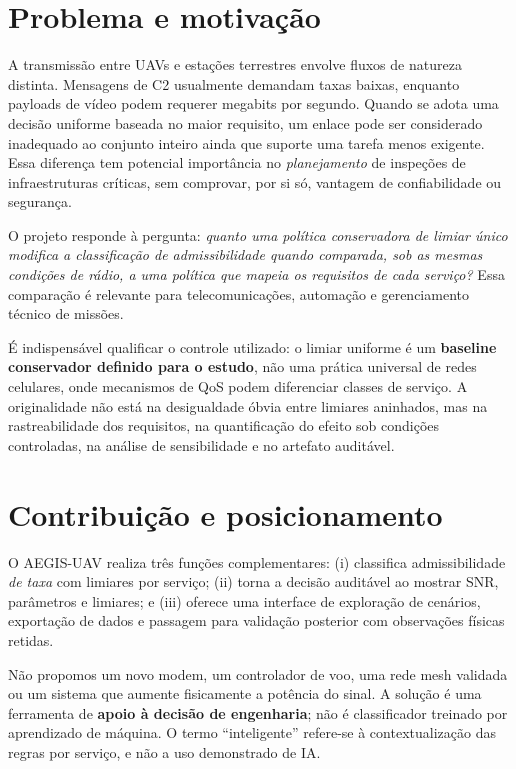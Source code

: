 \documentclass[10pt,a4paper,twocolumn]{article}
\begin{document}
\section{Problema e motivação}
A transmissão entre UAVs e estações terrestres envolve fluxos de natureza distinta. Mensagens de C2 usualmente demandam taxas baixas, enquanto payloads de vídeo podem requerer megabits por segundo. Quando se adota uma decisão uniforme baseada no maior requisito, um enlace pode ser considerado inadequado ao conjunto inteiro ainda que suporte uma tarefa menos exigente. Essa diferença tem potencial importância no \emph{planejamento} de inspeções de infraestruturas críticas, sem comprovar, por si só, vantagem de confiabilidade ou segurança.

O projeto responde à pergunta: \emph{quanto uma política conservadora de limiar único modifica a classificação de admissibilidade quando comparada, sob as mesmas condições de rádio, a uma política que mapeia os requisitos de cada serviço?} Essa comparação é relevante para telecomunicações, automação e gerenciamento técnico de missões.

É indispensável qualificar o controle utilizado: o limiar uniforme é um \textbf{baseline conservador definido para o estudo}, não uma prática universal de redes celulares, onde mecanismos de QoS podem diferenciar classes de serviço. A originalidade não está na desigualdade óbvia entre limiares aninhados, mas na rastreabilidade dos requisitos, na quantificação do efeito sob condições controladas, na análise de sensibilidade e no artefato auditável.

\section{Contribuição e posicionamento}
O AEGIS-UAV realiza três funções complementares: (i) classifica admissibilidade \emph{de taxa} com limiares por serviço; (ii) torna a decisão auditável ao mostrar SNR, parâmetros e limiares; e (iii) oferece uma interface de exploração de cenários, exportação de dados e passagem para validação posterior com observações físicas retidas.

Não propomos um novo modem, um controlador de voo, uma rede mesh validada ou um sistema que aumente fisicamente a potência do sinal. A solução é uma ferramenta de \textbf{apoio à decisão de engenharia}; não é classificador treinado por aprendizado de máquina. O termo ``inteligente'' refere-se à contextualização das regras por serviço, e não a uso demonstrado de IA.
\end{document}
